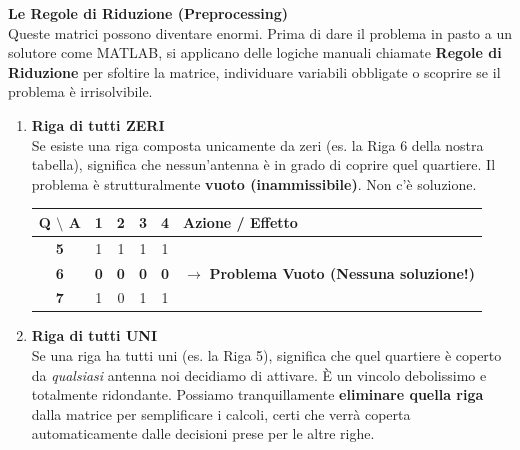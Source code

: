 \documentclass[12pt, a4paper]{article}
\renewcommand{\arraystretch}{1.25}
\begin{document}
	\vspace{0.4cm}
	\textbf{Le Regole di Riduzione (Preprocessing)}\\
	Queste matrici possono diventare enormi. Prima di dare il problema in pasto a un solutore come MATLAB, si applicano delle logiche manuali chiamate \textbf{Regole di Riduzione} per sfoltire la matrice, individuare variabili obbligate o scoprire se il problema è irrisolvibile.
	
	\begin{enumerate}[label=\textbf{Regola \arabic*:}, itemsep=5pt, leftmargin=2.2cm]
		\item \textbf{Riga di tutti ZERI}\\
		Se esiste una riga composta unicamente da zeri (es. la Riga 6 della nostra tabella), significa che nessun'antenna è in grado di coprire quel quartiere. Il problema è strutturalmente \textbf{vuoto (inammissibile)}. Non c'è soluzione.
		
		\vspace{0.2cm}
		\begin{center}
			\renewcommand{\arraystretch}{1.2}
			\begin{tabular}{|c|c|c|c|c|l|}
				\hline
				\textbf{Q $\setminus$ A} & \textbf{1} & \textbf{2} & \textbf{3} & \textbf{4} & \textbf{Azione / Effetto} \\ \hline
				\textbf{5} & 1 & 1 & 1 & 1 & \\ \hline
				\rowcolor{red!15} \textbf{6} & \textbf{0} & \textbf{0} & \textbf{0} & \textbf{0} & $\rightarrow$ \textbf{Problema Vuoto (Nessuna soluzione!)} \\ \hline
				\textbf{7} & 1 & 0 & 1 & 1 & \\ \hline
			\end{tabular}
		\end{center}
		\vspace{0.4cm}
		
		\item \textbf{Riga di tutti UNI}\\
		Se una riga ha tutti uni (es. la Riga 5), significa che quel quartiere è coperto da \textit{qualsiasi} antenna noi decidiamo di attivare. È un vincolo debolissimo e totalmente ridondante. Possiamo tranquillamente \textbf{eliminare quella riga} dalla matrice per semplificare i calcoli, certi che verrà coperta automaticamente dalle decisioni prese per le altre righe.
		

\end{enumerate}
\end{document}

